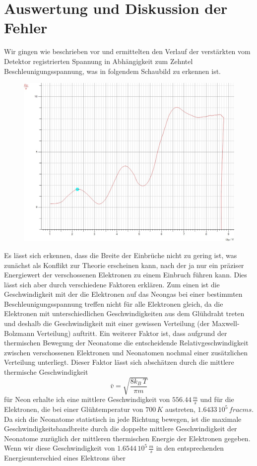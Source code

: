 \documentclass[a4paper, 12pt]{scrartcl}
\begin{document}
\section{Auswertung und Diskussion der Fehler}
Wir gingen wie beschrieben vor und ermittelten den Verlauf der verstärkten vom Detektor registrierten Spannung in Abhängigkeit zum Zehntel Beschleunigungsspannung, was in folgendem Schaubild zu erkennen ist. 
\begin{figure}[H]\includegraphics[scale=0.6]{Diagramm}\end{figure}
Es lässt sich erkennen, dass die Breite der Einbrüche nicht zu gering ist, was zunächst als Konflikt zur Theorie erscheinen kann, nach der ja nur ein präziser Energiewert der verschossenen Elektronen zu einem Einbruch führen kann. Dies lässt sich  aber durch verschiedene Faktoren erklären. Zum einen ist die Geschwindigkeit mit der die Elektronen auf das Neongas bei einer bestimmten Beschleunigungsspannung treffen nicht für alle Elektronen gleich, da die Elektronen mit unterschiedlichen Geschwindigkeiten aus dem Glühdraht treten und deshalb die Geschwindigkeit mit einer gewissen Verteilung (der Maxwell-Bolzmann Verteilung) auftritt.
Ein weiterer Faktor ist, dass aufgrund der thermischen Bewegung der Neonatome die entscheidende Relativgeschwindigkeit zwischen verschossenen Elektronen und Neonatomen nochmal einer zusätzlichen Verteilung unterliegt. Dieser Faktor lässt sich abschätzen durch die mittlere thermische Geschwindigkeit
\begin{equation*}\bar{v}=\sqrt{\frac{8k_B\,T}{\pi{m}}}\end{equation*}
für Neon erhalte ich eine mittlere Geschwindigkeit von $556.44\,\frac{m}{s}$ und für die Elektronen, die bei einer Glühtemperatur von $700\,K$ austreten, $1.6433\,10^{5}\,frac{m}{s}$. Da sich die Neonatome statistisch in jede Richtung bewegen, ist die maximale Geschwindigkeitsbandbreite durch die doppelte mittlere Geschwindigkeit der Neonatome zuzüglich der mittleren thermischen Energie der Elektronen gegeben. Wenn wir diese Geschwindigkeit von $1.6544\,10^{5}\,\frac{m}{s}$ in den entsprechenden Energieunterschied eines Elektrons über
\end{document}

